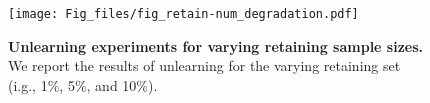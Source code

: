 \begin{wrapfigure}{r}{9cm}
\centerline{
\texttt{[image: Fig\_files/fig\_retain-num\_degradation.pdf]}
}
\caption{\textbf{Unlearning experiments for varying retaining sample sizes.} We report the results of unlearning for the varying retaining set (i.g., 1\%, 5\%, and 10\%).}
\label{fig:num_retain}
\end{wrapfigure}

